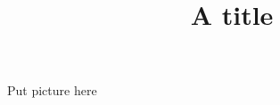 \documentclass{../coloringBook}
\title{A title}
\begin{document}
\begin{image}
  Put picture here
\end{image}

\begin{explanation}
\end{explanation}

\begin{mathConnections}
\end{mathConnections}

\maketitle
\end{document}
